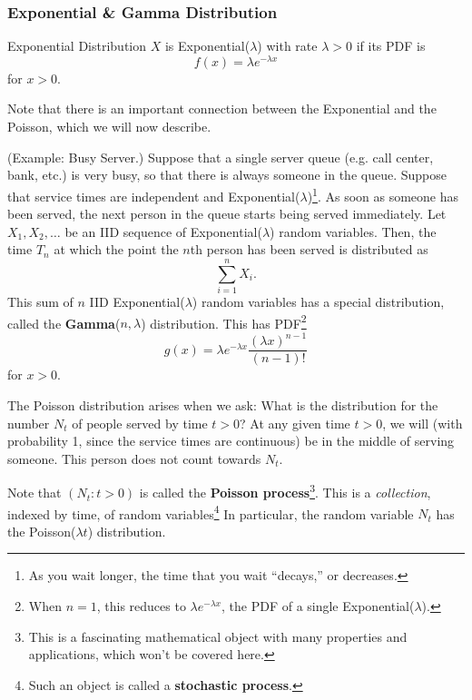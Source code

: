 \subsubsection{Exponential \& Gamma Distribution}
\begin{definition}{Exponential Distribution}{}
    $X$ is Exponential($\lambda$) with rate $\lambda > 0$ if its PDF is 
    \[f(x) = \lambda e^{-\lambda x}\]
    for $x > 0$. 
\end{definition}
Note that there is an important connection between the Exponential and the Poisson, which we will now describe. 
\begin{mdframed}[]
    (Example: Busy Server.) Suppose that a single server queue (e.g. call center, bank, etc.) is very busy, so that there is always someone in the queue. Suppose that service times are independent and Exponential($\lambda$)\footnote{As you wait longer, the time that you wait ``decays,'' or decreases.}. As soon as someone has been served, the next person in the queue starts being served immediately. Let $X_1, X_2, \dots$ be an IID sequence of Exponential($\lambda$) random variables. Then, the time $T_n$ at which the point the $n$th person has been served is distributed as \[\sum_{i = 1}^{n} X_i.\] This sum of $n$ IID Exponential($\lambda$) random variables has a special distribution, called the \textbf{Gamma}($n, \lambda$) distribution. This has PDF\footnote{When $n = 1$, this reduces to $\lambda e^{-\lambda x}$, the PDF of a single Exponential($\lambda$).} 
    \[g(x) = \lambda e^{-\lambda x} \frac{(\lambda x)^{n - 1}}{(n - 1)!}\]
    for $x > 0$.
\end{mdframed}
The Poisson distribution arises when we ask: What is the distribution for the number $N_t$ of people served by time $t > 0$? At any given time $t > 0$, we will (with probability 1, since the service times are continuous) be in the middle of serving someone. This person does not count towards $N_t$. 

\bigskip 

Note that $(N_t : t > 0)$ is called the \textbf{Poisson process}\footnote{This is a fascinating mathematical object with many properties and applications, which won't be covered here.}. This is a \emph{collection}, indexed by time, of random variables\footnote{Such an object is called a \textbf{stochastic process}.} In particular, the random variable $N_t$ has the Poisson($\lambda t$) distribution.

